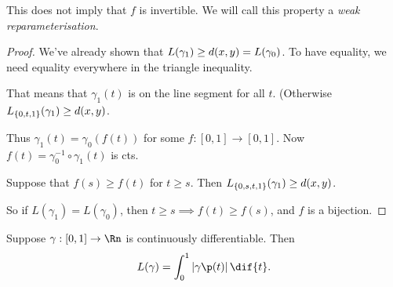 \vspace{-6pt}

This does not imply that $f$ is invertible. We will call this property a \emph{weak reparameterisation}.

\begin{proof}
	We've already shown that $L(\gamma_1) \geq d(x,y) = L(\gamma_0)$. To have equality, we need equality everywhere in the triangle inequality. %
	
	That means that $\gamma_1(t)$ is on the line segment for all $t$. (Otherwise $L_{\{0,t,1\}}(\gamma_1) \geq d(x,y)$.

	Thus $\gamma_1(t)=\gamma_0(f(t))$ for some $f:[0,1] \to [0,1]$. Now $f(t) = \gamma_0^{-1} \circ \gamma_1(t)$ is cts.

	Suppose that $f(s) \geq f(t)$ for $t\geq s$. Then $L_{\{0,s,t,1\}}(\gamma_1) \geq d(x,y)$.

	So if $L(\gamma_1) = L(\gamma_0)$, then $t\geq s \implies f(t) \geq f(s)$, and $f$ is a bijection.
\end{proof}

	\pagebreak

\begin{proposition}
	Suppose $\gamma:[0,1] \to \Rn$ is continuously differentiable. Then %
	\begin{equation*}
		L(\gamma) = \int_0^1 \left\vert \gamma\p(t) \right\vert \dif{t}.
	\end{equation*}
\end{proposition}

